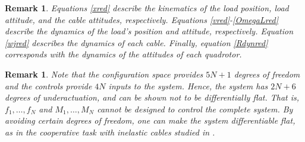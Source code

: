 \documentclass[letterpaper, 10 pt, conference]{ieeeconf}  %
\newcounter{part} %
\newcommand{\eff}{\text{eff}}
\newtheorem{remarkth}[definition]{Remark}
\newenvironment{remark}{\begin{remarkth}\upshape}{\end{remarkth}}
\begin{document}


\begin{remark}
Equations \eqref{xred} describe the kinematics of the load position, load attitude, and the cable attitudes, respectively.  Equations \eqref{vred}-\eqref{OmegaLred} describe the dynamics of the load's position and attitude, respectively. Equation \eqref{wjred} describes the dynamics of each cable. Finally, equation \eqref{Rdynred} corresponds with the dynamics of the attitudes of each quadrotor.
\end{remark}
\begin{remark}
Note that the configuration space provides $5N + 1$ degrees of freedom and the controls provide $4N$ inputs to the system. Hence, the system has $2N + 6$ degrees of underactuation, and can be shown not to be differentially flat. That is, $f_1, \dots, f_N$ and $M_1, \dots, M_N$ cannot be designed to control the complete system. By avoiding certain degrees of freedom, one can make the system differentiable flat, as in the cooperative task with inelastic cables studied in \cite{wu}. %
\end{remark}
\end{document}

